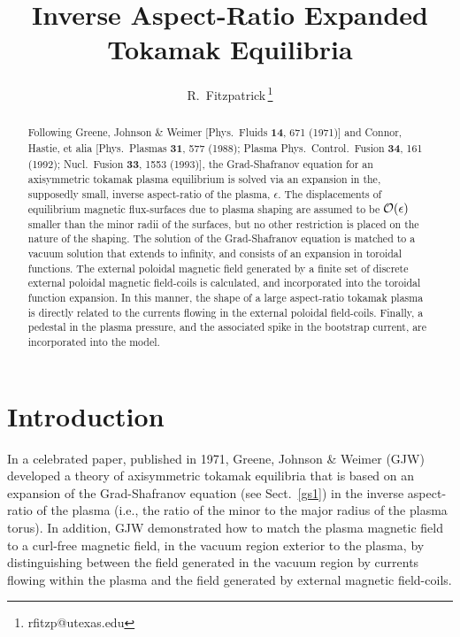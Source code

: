 \documentclass[12pt,prb,aps]{revtex4-1}
\begin{document}
\title{Inverse Aspect-Ratio Expanded Tokamak Equilibria}
\author{R.~Fitzpatrick\,\footnote{rfitzp@utexas.edu}}
\begin{abstract}
Following Greene, Johnson \& Weimer  [Phys.\  Fluids  {\bf 14}, 671 (1971)] and Connor, Hastie, et alia [Phys.\ Plasmas {\bf 31}, 577 (1988); Plasma Phys.\ Control.\ Fusion {\bf 34}, 161 (1992); Nucl.\ Fusion {\bf 33}, 1553 (1993)],  the
Grad-Shafranov equation for an axisymmetric tokamak plasma equilibrium  is solved via an expansion in the, supposedly small,  inverse aspect-ratio of the plasma, $\epsilon$. 
The displacements of equilibrium magnetic flux-surfaces due to plasma shaping are assumed to be ${\cal O}(\epsilon)$ smaller than the minor radii
of the surfaces, but no other restriction is placed on the nature of the shaping. The solution of the Grad-Shafranov
equation is matched  to a vacuum solution that extends to infinity, and consists of an expansion in toroidal functions. The external poloidal magnetic
field generated by a finite set of discrete external poloidal magnetic field-coils is calculated, and incorporated  into the toroidal function expansion. 
In this manner, the shape of a large aspect-ratio tokamak plasma is directly related to the currents flowing in the external poloidal field-coils. 
Finally, a pedestal in the plasma pressure, and the associated spike in the bootstrap
current, are incorporated into the model.  
\end{abstract}
\maketitle

\section{Introduction}
In a celebrated paper, published in 1971, Greene, Johnson \& Weimer (GJW) developed a theory of axisymmetric tokamak
equilibria that is based on an expansion of the Grad-Shafranov equation (see Sect.~\ref{gs1}) in the inverse aspect-ratio of the plasma (i.e., the ratio of the minor to the  major radius of the plasma torus).\cite{greene} In addition, GJW demonstrated how to  match the
plasma magnetic field to a curl-free magnetic field, in the vacuum region exterior to the plasma,  by distinguishing between the field generated in the vacuum region by currents flowing within the plasma 
and the field generated by external magnetic field-coils. 
\end{document}
